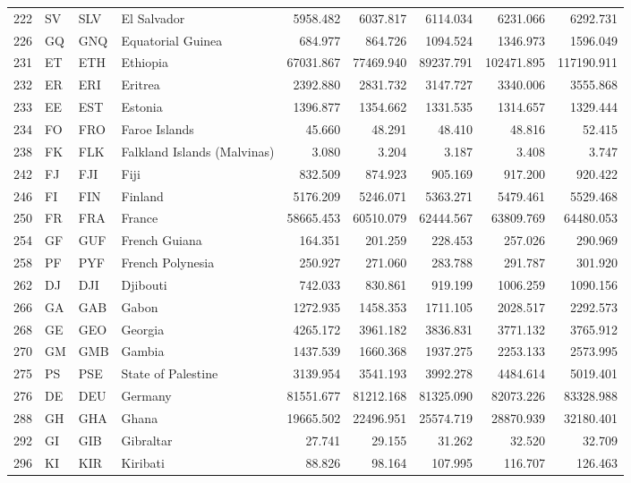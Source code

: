{\begin{longtable}{rlllrrrrr}
 222 & SV & SLV & El Salvador & 5958.482 & 6037.817 & 6114.034 & 6231.066 & 6292.731 \\
 226 & GQ & GNQ & Equatorial Guinea & 684.977 & 864.726 & 1094.524 & 1346.973 & 1596.049 \\
 231 & ET & ETH & Ethiopia & 67031.867 & 77469.940 & 89237.791 & 102471.895 & 117190.911 \\
 232 & ER & ERI & Eritrea & 2392.880 & 2831.732 & 3147.727 & 3340.006 & 3555.868 \\
 233 & EE & EST & Estonia & 1396.877 & 1354.662 & 1331.535 & 1314.657 & 1329.444 \\
 234 & FO & FRO & Faroe Islands & 45.660 & 48.291 & 48.410 & 48.816 & 52.415 \\
 238 & FK & FLK & Falkland Islands (Malvinas) & 3.080 & 3.204 & 3.187 & 3.408 & 3.747 \\
 242 & FJ & FJI & Fiji & 832.509 & 874.923 & 905.169 & 917.200 & 920.422 \\
 246 & FI & FIN & Finland & 5176.209 & 5246.071 & 5363.271 & 5479.461 & 5529.468 \\
 250 & FR & FRA & France & 58665.453 & 60510.079 & 62444.567 & 63809.769 & 64480.053 \\
 254 & GF & GUF & French Guiana & 164.351 & 201.259 & 228.453 & 257.026 & 290.969 \\
 258 & PF & PYF & French Polynesia & 250.927 & 271.060 & 283.788 & 291.787 & 301.920 \\
 262 & DJ & DJI & Djibouti & 742.033 & 830.861 & 919.199 & 1006.259 & 1090.156 \\
 266 & GA & GAB & Gabon & 1272.935 & 1458.353 & 1711.105 & 2028.517 & 2292.573 \\
 268 & GE & GEO & Georgia & 4265.172 & 3961.182 & 3836.831 & 3771.132 & 3765.912 \\
 270 & GM & GMB & Gambia & 1437.539 & 1660.368 & 1937.275 & 2253.133 & 2573.995 \\
 275 & PS & PSE & State of Palestine & 3139.954 & 3541.193 & 3992.278 & 4484.614 & 5019.401 \\
 276 & DE & DEU & Germany & 81551.677 & 81212.168 & 81325.090 & 82073.226 & 83328.988 \\
 288 & GH & GHA & Ghana & 19665.502 & 22496.951 & 25574.719 & 28870.939 & 32180.401 \\
 292 & GI & GIB & Gibraltar & 27.741 & 29.155 & 31.262 & 32.520 & 32.709 \\
 296 & KI & KIR & Kiribati & 88.826 & 98.164 & 107.995 & 116.707 & 126.463 \\

\end{longtable}}
